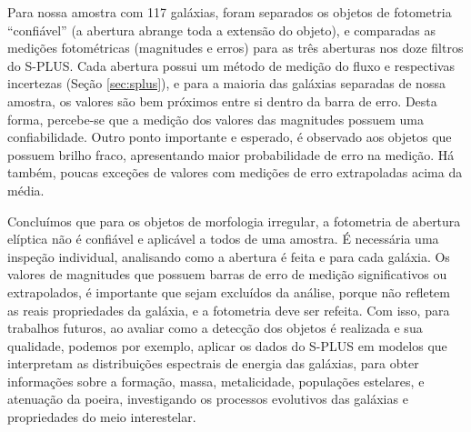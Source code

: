 Para nossa amostra com 117 galáxias, foram separados os objetos de fotometria ``confiável'' (a abertura abrange toda a extensão do objeto), e comparadas as medições fotométricas (magnitudes e erros) para as três aberturas nos doze filtros do S-PLUS. Cada abertura possui um método de medição do fluxo e respectivas incertezas (Seção \ref{sec:splus}), e para a maioria das galáxias separadas de nossa amostra, os valores são bem próximos entre si dentro da barra de erro. Desta forma, percebe-se que a medição dos valores das magnitudes possuem uma confiabilidade. Outro ponto importante e esperado, é observado aos objetos que possuem brilho fraco, apresentando maior probabilidade de erro na medição. Há também, poucas exceções de valores com medições de erro extrapoladas acima da média. 

Concluímos que para os objetos de morfologia irregular, a fotometria de abertura elíptica não é confiável e aplicável a todos de uma amostra. É necessária uma inspeção individual, analisando como a abertura é feita e para cada galáxia. Os valores de magnitudes que possuem barras de erro de medição significativos ou extrapolados, é importante que sejam excluídos da análise, porque não refletem as reais propriedades da galáxia, e a fotometria deve ser refeita. Com isso, para trabalhos futuros, ao avaliar como a detecção dos objetos é realizada e sua qualidade, podemos por exemplo, aplicar os dados do S-PLUS em modelos que interpretam as distribuições espectrais de energia das galáxias, para obter informações sobre a formação, massa, metalicidade, populações estelares, e atenuação da poeira, investigando os processos evolutivos das galáxias e propriedades do meio interestelar.

